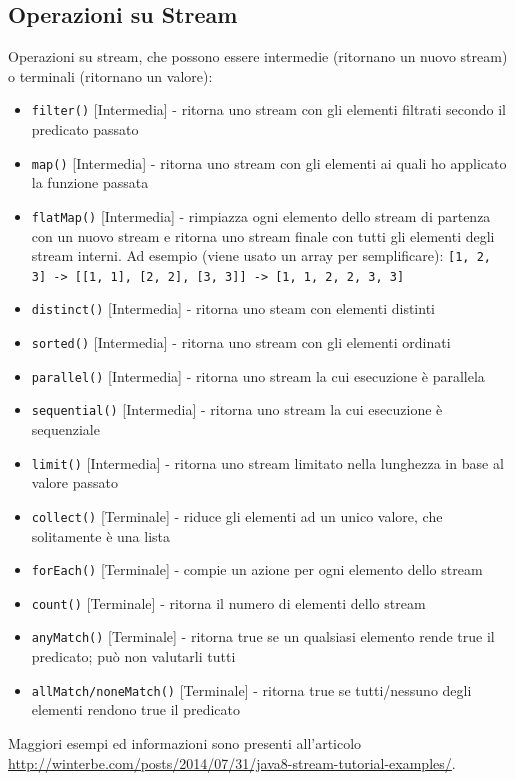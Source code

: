 \subsection{Operazioni su Stream}

Operazioni su stream, che possono essere intermedie (ritornano un nuovo stream) o terminali (ritornano un valore):

\begin{itemize}
\item \texttt{filter()} [Intermedia] - ritorna uno stream con gli elementi filtrati secondo il predicato passato 
\item \texttt{map()} [Intermedia] - ritorna uno stream con gli elementi ai quali ho applicato la funzione passata 
\item \texttt{flatMap()} [Intermedia] - rimpiazza ogni elemento dello stream di partenza con un nuovo stream e ritorna uno stream finale con tutti gli elementi degli stream interni. Ad esempio (viene usato un array per semplificare): \texttt{[1, 2, 3] -> [[1, 1], [2, 2], [3, 3]] -> [1, 1, 2, 2, 3, 3]} 
\item \texttt{distinct()} [Intermedia] - ritorna uno steam con elementi distinti 
\item \texttt{sorted()} [Intermedia] - ritorna uno stream con gli elementi ordinati 
\item \texttt{parallel()} [Intermedia] - ritorna uno stream la cui esecuzione è parallela 
\item \texttt{sequential()} [Intermedia] - ritorna uno stream la cui esecuzione è sequenziale
\item \texttt{limit()} [Intermedia] - ritorna uno stream limitato nella lunghezza in base al valore passato 
\item \texttt{collect()} [Terminale] - riduce gli elementi ad un unico valore, che solitamente è una lista
\item \texttt{forEach()} [Terminale] - compie un azione per ogni elemento dello stream 
\item \texttt{count()} [Terminale] - ritorna il numero di elementi dello stream 
\item \texttt{anyMatch()} [Terminale] - ritorna true se un qualsiasi elemento rende true il predicato; può non valutarli tutti 
\item \texttt{allMatch/noneMatch()} [Terminale] - ritorna true se tutti/nessuno degli elementi rendono true il predicato 
\end{itemize}

Maggiori esempi ed informazioni sono presenti all'articolo \url{http://winterbe.com/posts/2014/07/31/java8-stream-tutorial-examples/}.
